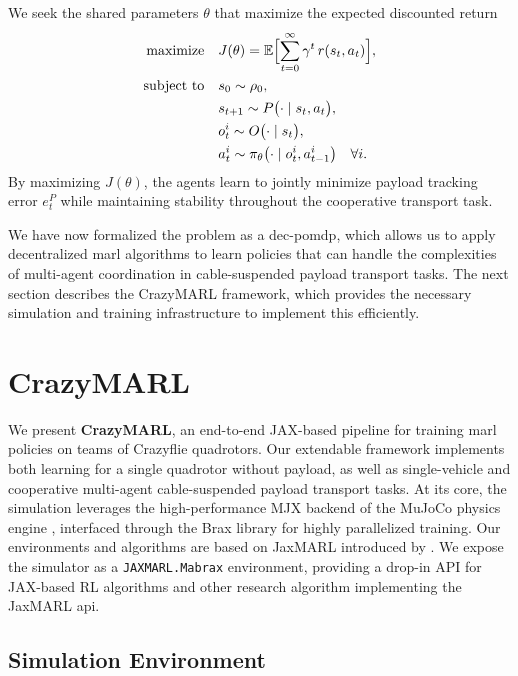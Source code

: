 We seek the shared parameters \(\theta\) that maximize the expected discounted return
\begin{equation}
\begin{aligned}
\text{maximize}\quad & J(\theta) = \mathbb{E}\Bigl[\sum_{t=0}^\infty \gamma^t\,r(s_t,a_t)\Bigr],\\
\text{subject to}\quad &s_0 \sim \rho_0,\\
&s_{t+1} \sim P\bigl(\cdot\mid s_t,a_t\bigr),\\
&o^i_t \sim O\bigl(\cdot\mid s_t\bigr),\\
&a^i_t \sim \pi_{\theta}\bigl(\cdot\mid o^i_t,a^i_{t-1}\bigr)
\quad\forall i.
\end{aligned}
\end{equation}
By maximizing \(J(\theta)\), the agents learn to jointly minimize payload tracking error \(e^P_t\) while maintaining stability throughout the cooperative transport task.

We have now formalized the problem as a \gls{dec-pomdp}, which allows us to apply decentralized \gls{marl} algorithms to learn policies that can handle the complexities of multi-agent coordination in cable-suspended payload transport tasks. The next section describes the CrazyMARL framework, which provides the necessary simulation and training infrastructure to implement this efficiently.

\section{CrazyMARL}
We present \textbf{CrazyMARL}, an end-to-end JAX-based pipeline for training \gls{marl} policies on teams of Crazyflie quadrotors. Our extendable framework implements both learning for a single quadrotor without payload, as well as single-vehicle and cooperative multi-agent cable-suspended payload transport tasks. At its core, the simulation leverages the high-performance MJX backend of the MuJoCo physics engine \cite{todorov_mujoco_2012}, interfaced through the Brax library for highly parallelized training. Our environments and algorithms are based on JaxMARL introduced by \autocite{flair2023jaxmarl}. We expose the simulator as a \texttt{JAXMARL.Mabrax} environment, providing a drop-in API for JAX-based RL algorithms and other research algorithm implementing the JaxMARL api.

\subsection{Simulation Environment}

